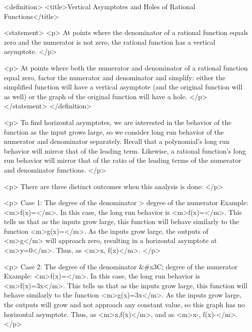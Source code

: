         <definition>
            <title>Vertical Asymptotes and Holes of Rational Functions</title>

            <statement>
                <p>
                    At points where the denominator of a rational function equals zero and the numerator is not zero, the rational function has a vertical asymptote.
                </p>

                <p>
                    At points where both the numerator and denominator of a rational function equal zero, factor the numerator and denominator and simplify: either the simplified function will have a vertical asymptote (and the original function will as well) or the graph of the original function will have a hole.
                </p>
            </statement>
        </definition>

        <p>
            To find horizontal asymptotes, we are interested in the behavior of the function as the input grows large, so we consider long run behavior of the numerator and denominator separately.
            Recall that a polynomial’s long run behavior will mirror that of the leading term.
            Likewise, a rational function’s long run behavior will mirror that of the ratio of the leading terms of the numerator and denominator functions.
        </p>

        <p>
            There are three distinct outcomes when this analysis is done:
        </p>

        <p>
            Case 1: The degree of the denominator > degree of the numerator Example: <m>f(x)=</m>.
            In this case, the long run behavior is <m>f(x)\approx {}=</m>.
            This tells us that as the inputs grow large, this function will behave similarly to the function <m>g(x)=</m>.
            As the inputs grow large, the outputs of <m>g</m> will approach zero, resulting in a horizontal asymptote at <m>y=0</m>.
            Thus, as <m>x\to \pm \infty, f(x)</m>.
        </p>

        <p>
            Case 2: The degree of the denominator &#x3C; degree of the numerator Example: <m>f(x)=</m>.
            In this case, the long run behavior is <m>f(x)\approx {}=3x</m>.
            This tells us that as the inputs grow large, this function will behave similarly to the function <m>g(x)=3x</m>.
            As the inputs grow large, the outputs will grow and not approach any constant value, so this graph has no horizontal asymptote.
            Thus, as <m>x\to \infty,f(x)\to \infty</m>, and as <m>x\to-\infty, f(x)\to -\infty</m>.
        </p>

